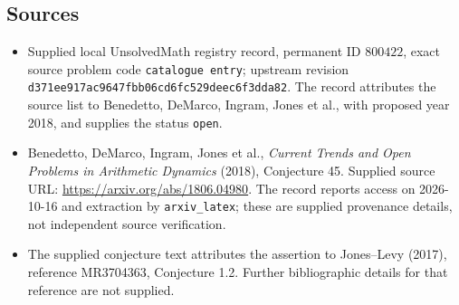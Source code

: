 \documentclass[11pt]{article}
\begin{document}
\subsection{Sources}
\begin{itemize}
\item Supplied local UnsolvedMath registry record, permanent ID \(800422\), exact source problem code \texttt{catalogue entry}; upstream revision \texttt{d371ee917ac9647fbb06cd6fc529deec6f3dda82}. The record attributes the source list to Benedetto, DeMarco, Ingram, Jones et al., with proposed year 2018, and supplies the status \texttt{open}.
\item Benedetto, DeMarco, Ingram, Jones et al., \emph{Current Trends and Open Problems in Arithmetic Dynamics} (2018), Conjecture 45. Supplied source URL: \url{https://arxiv.org/abs/1806.04980}. The record reports access on 2026-10-16 and extraction by \texttt{arxiv\_latex}; these are supplied provenance details, not independent source verification.
\item The supplied conjecture text attributes the assertion to Jones--Levy (2017), reference MR3704363, Conjecture 1.2. Further bibliographic details for that reference are not supplied.
\end{itemize}
\end{document}

